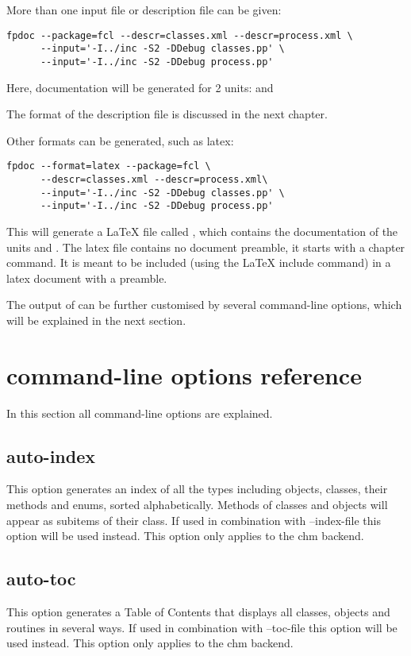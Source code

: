 More than one input file or description file can be given:
\begin{verbatim}
fpdoc --package=fcl --descr=classes.xml --descr=process.xml \
      --input='-I../inc -S2 -DDebug classes.pp' \
      --input='-I../inc -S2 -DDebug process.pp'
\end{verbatim}
Here, documentation will be generated for 2 units: 
and 

The format of the description file is discussed in the next chapter.

Other formats can be generated, such as latex:
\begin{verbatim}
fpdoc --format=latex --package=fcl \
      --descr=classes.xml --descr=process.xml\
      --input='-I../inc -S2 -DDebug classes.pp' \
      --input='-I../inc -S2 -DDebug process.pp'
\end{verbatim}
This will generate a LaTeX file called , which contains the
documentation of the units \file{classes} and . The latex file
contains no document preamble, it starts with a chapter command. 
It is meant to be included (using the LaTeX include command) in a latex 
document with a preamble.

The output of \fpdoc can be further customised by several command-line
options, which will be explained in the next section.

\section{\fpdoc command-line options reference}
In this section all \fpdoc command-line options are explained.

\subsection{auto-index}
This option generates an index of all the types including objects, 
classes, their methods and enums, sorted alphabetically. Methods 
of classes and objects will appear as subitems of their class. If used
in combination with --index-file this option will be used instead. 
This option only applies to the chm backend.

\subsection{auto-toc}
This option generates a Table of Contents that displays all classes,
objects and routines in several ways. If used in combination with
--toc-file this option will be used instead. This option only applies 
to the chm backend.

